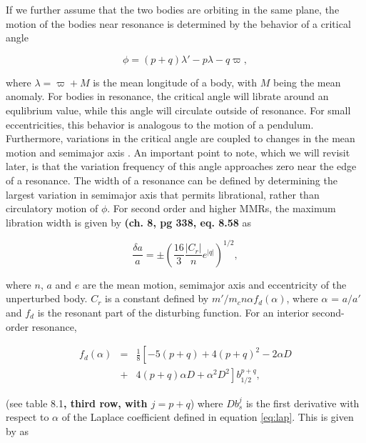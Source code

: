 \documentclass[fleqn,usenatbib]{mnras}
\begin{document}
If we further assume that the two bodies are orbiting in the same plane, the motion of the bodies near resonance is determined by the
behavior of a critical angle

\begin{equation}\label{eq:phi_crit}
	\phi = (p + q) \lambda' - p \lambda - q \varpi,
\end{equation}

\noindent where $\lambda = \varpi + M$ is the mean longitude of a
body, with $M$ being the mean anomaly. For bodies in resonance, the critical angle will librate around an 
equlibrium value, while this angle will circulate outside of resonance. For small eccentricities, this behavior is analogous to the motion of a 
pendulum. Furthermore, variations in the critical angle are coupled to changes in the mean motion and semimajor axis \citep{1999ssd..book.....M}. An important 
point to note, which we will revisit later, is that the variation frequency of this angle approaches zero near the edge of a resonance. The 
width of a resonance can be defined by determining the largest variation in semimajor axis that permits librational, rather than circulatory motion of $\phi$. For 
second order and higher MMRs, the maximum libration width is given by \citet{1999ssd..book.....M} \textbf{(ch. 8, pg 338, eq. 8.58} as

\begin{equation}\label{eq:res_so}
	\frac{\delta a}{a} = \pm \left( \frac{16}{3} \frac{\left| C_{r} \right|}{n} e^{\left| q \right|} \right)^{1/2},
\end{equation}

\noindent where $n$, $a$ and $e$ are the mean motion, semimajor axis and eccentricity of the unperturbed body. $C_{r}$ is a constant defined by 
$m'/m_{c} n \alpha f_{d}(\alpha)$, where $\alpha$ = $a/a'$ and $f_{d}$ is the resonant part of the disturbing function. For an interior second-order 
resonance,

\begin{eqnarray}\label{eq:fd_so}
	f_{d} (\alpha) &=& \frac{1}{8} \left[ -5(p+q) + 4(p+q)^{2} - 2 \alpha D \right. \\ \nonumber
	                      & + & \left. 4(p+q) \alpha D + \alpha^{2} D^{2} \right] b^{p+q}_{1/2},
\end{eqnarray}

\noindent (see \citet{1999ssd..book.....M} table 8.1\textbf{, third row, with $j = p + q$}) where $D b^{j}_{s}$ is the first derivative with respect to $\alpha$ of the Laplace coefficient defined in equation \ref{eq:lap}. This is given by \citet{1961mcm..book.....B} as
\end{document}
